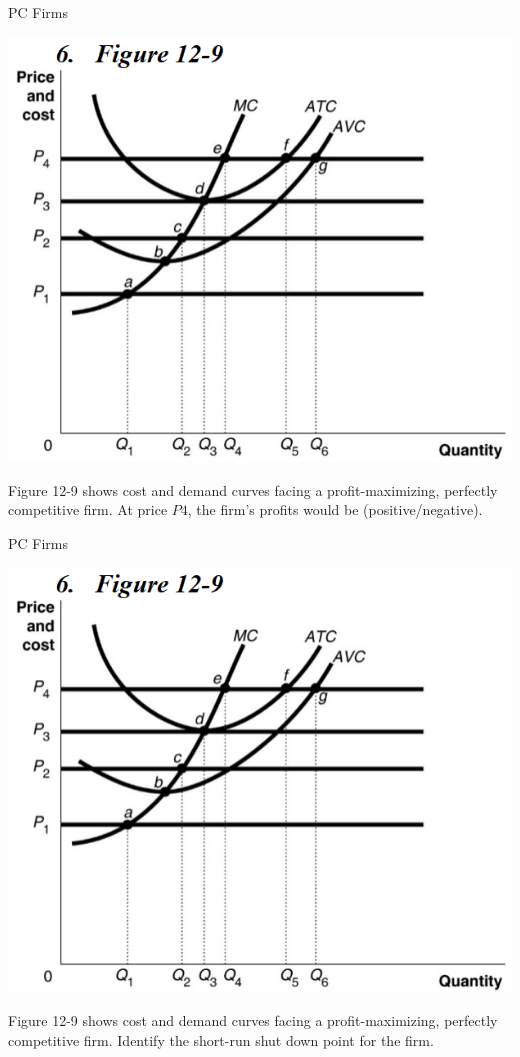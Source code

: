 \documentclass{beamer}
\begin{document}
\begin{frame}[t]{PC Firms}
    \begin{center}
        \includegraphics[scale=.6]{images/graph.png}
    \end{center}
    \newline
    Figure 12-9 shows cost and demand curves facing a profit-maximizing, perfectly competitive firm. At price $P4$, the firm’s profits would be (positive/negative).
\end{frame}

\begin{frame}[t]{PC Firms}
    \begin{center}
        \includegraphics[scale=.6]{images/graph.png}
    \end{center}
    \newline
    Figure 12-9 shows cost and demand curves facing a profit-maximizing, perfectly competitive firm. Identify the short-run shut down point for the firm.
\end{frame}
\end{document}
